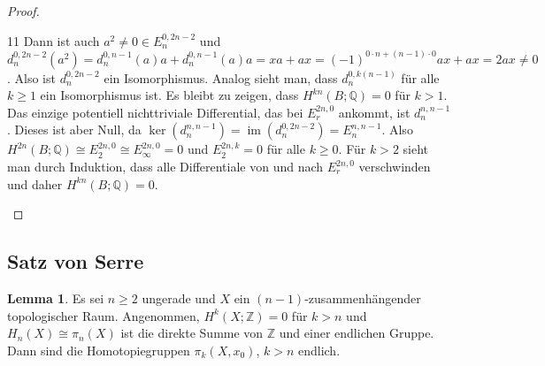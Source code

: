 \documentclass[11pt, a4paper, german]{article}
\theoremstyle{definition}
\newtheorem{lem}{Lemma}
\theoremstyle{remark}
\newcommand{\Z}{\mathbb{Z}} %
\newcommand{\Q}{\mathbb{Q}} %
\DeclareMathOperator{\im}{im} %
\begin{document}
\begin{proof}
\begin{cutout}{0}{0pt}{\dimexpr\linewidth-5.5cm\relax}{11}
    Dann ist auch $a^2 \neq 0 \in E_n^{0,2n-2}$ und $d_n^{0,2n-2}(a^2) = d_n^{0,n-1}(a)a + d_n^{0,n-1}(a)a = xa + ax = (-1)^{0 \cdot n + (n-1) \cdot 0} ax + ax = 2ax \neq 0$.
    Also ist $d_n^{0,2n-2}$ ein Isomorphismus.
    Analog sieht man, dass $d_n^{0,k(n-1)}$ für alle $k \geq 1$ ein Isomorphismus ist.
    Es bleibt zu zeigen, dass $H^{kn}(B; \Q) = 0$ für $k > 1$.
    Das einzige potentiell nichttriviale Differential, das bei $E_r^{2n,0}$ ankommt, ist $d_n^{n,n-1}$.
    Dieses ist aber Null, da $\ker(d_n^{n,n-1}) = \im(d_n^{0,2n-2}) = E_n^{n,n-1}$.
    Also $H^{2n}(B; \Q) \cong E_2^{2n,0} \cong E_\infty^{2n,0} = 0$ und $E_2^{2n,k} = 0$ für alle $k \geq 0$.
    Für $k > 2$ sieht man durch Induktion, dass alle Differentiale von und nach $E_r^{2n,0}$ verschwinden und daher $H^{kn}(B; \Q) = 0$.
  \end{cutout}
\end{proof}

\subsection{Satz von Serre}

\begin{lem}
  Es sei $n \geq 2$ ungerade und $X$ ein $(n{-}1)$-zusammenhängender topologischer Raum.
  Angenommen, $H^k(X; \Z) = 0$ für $k > n$ und $H_n(X) \cong \pi_n(X)$ ist die direkte Summe von $\Z$ und einer endlichen Gruppe.
  Dann sind die Homotopiegruppen $\pi_k(X, x_0)$, $k > n$ endlich.
\end{lem}
\end{document}
